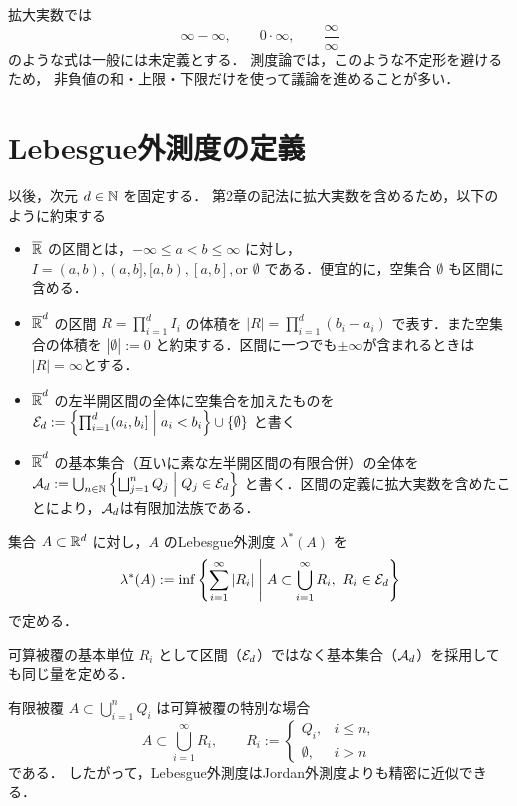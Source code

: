 \begin{remark}
拡大実数では
\[
\infty-\infty,\qquad 0\cdot\infty,\qquad \frac{\infty}{\infty}
\]
のような式は一般には未定義とする．
測度論では，このような不定形を避けるため，
非負値の和・上限・下限だけを使って議論を進めることが多い．
\end{remark}

\section{Lebesgue外測度の定義}

以後，次元 $d \in \mathbb N$ を固定する．
第2章の記法に拡大実数を含めるため，以下のように約束する
\begin{itemize}
    \item $\overline{\mathbb R}$ の区間とは，$-\infty \le a < b \le \infty$ に対し，$I = (a,b), (a,b], [a,b), [a,b], \text{or } \emptyset$ である．便宜的に，空集合 $\emptyset$ も区間に含める．
    \item $\overline{\mathbb R}^d$ の区間 $R = \prod_{i=1}^d I_i$ の体積を $|R| = \prod_{i=1}^d (b_i - a_i)$ で表す．また空集合の体積を $|\emptyset|:=0$ と約束する．区間に一つでも$\pm \infty$が含まれるときは $|R|=\infty$とする．
    \item $\overline{\mathbb R}^d$ の左半開区間の全体に空集合を加えたものを
    $\mathcal E_d := \left\{ \prod_{i=1}^d (a_i,b_i] \;\middle|\; a_i < b_i \right\} \cup \{ \emptyset\}$
    と書く
    \item $\overline{\mathbb R}^d$ の基本集合（互いに素な左半開区間の有限合併）の全体を $\mathcal A_d := \bigcup_{n \in \mathbb N} \left\{ \bigsqcup_{j=1}^n Q_j \;\middle|\; Q_j \in \mathcal E_d\right\}$ と書く．区間の定義に拡大実数を含めたことにより，$\mathcal A_d$は有限加法族である．
\end{itemize}

\begin{definition}[Lebesgue外測度]
集合 $A \subset \mathbb R^d$ に対し，$A$ のLebesgue外測度 $\lambda^*(A)$ を
\[
\lambda^*(A)
:=
\inf\left\{
\sum_{i=1}^{\infty} |R_i|
\;\middle|\;
A \subset \bigcup_{i=1}^{\infty} R_i,\ 
R_i \in \calE_d
\right\}
\]
で定める．
\end{definition}

\begin{remark}
    可算被覆の基本単位 $R_i$ として区間（$\mathcal E_d$）ではなく基本集合（$\mathcal A_d$）を採用しても同じ量を定める．
\end{remark}

\begin{remark}
有限被覆 $A \subset \bigcup_{i=1}^n Q_i$ は可算被覆の特別な場合
\[
A \subset \bigcup_{i=1}^\infty R_i,
\qquad
R_i :=
\begin{cases}
Q_i, & i \le n,\\
\emptyset, & i > n
\end{cases}
\]
である．
したがって，Lebesgue外測度はJordan外測度よりも精密に近似できる．
\end{remark}

